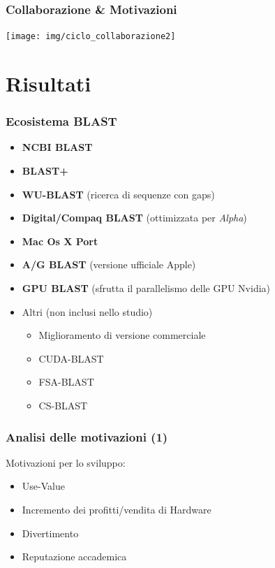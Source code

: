 \begin{frame}\frametitle{Collaborazione \& Motivazioni}

\begin{center}
    \texttt{[image: img/ciclo\_collaborazione2]}
\end{center}

\end{frame}

\section{Risultati}

\begin{frame}\frametitle{Ecosistema BLAST}

\Large

\begin{itemize}[<+->]
\itemsep1pt\parskip0pt
\item
  \alert{\textbf{NCBI BLAST}}
\item
  \alert{\textbf{BLAST+}}
\item
  \textbf{WU-BLAST} (ricerca di sequenze con gaps)
\item
  \textbf{Digital/Compaq BLAST} (ottimizzata per \emph{Alpha})
\item
  \textbf{Mac Os X Port}
\item
  \textbf{A/G BLAST} (versione ufficiale Apple)
\item
  \textbf{GPU BLAST} (sfrutta il parallelismo delle GPU Nvidia)
\item
  Altri (non inclusi nello studio)

  \begin{itemize}[<+->]
  \itemsep1pt\parskip0pt
  \item
    Miglioramento di versione commerciale
  \item
    CUDA-BLAST
  \item
    FSA-BLAST
  \item
    CS-BLAST
  \end{itemize}
\end{itemize}

\end{frame}

\begin{frame}\frametitle{Analisi delle motivazioni (1)}

\Large{Motivazioni per lo \alert{sviluppo}:}

\begin{itemize}[<+->]
\itemsep1pt\parskip0pt
\item
  Use-Value
\item
  Incremento dei profitti/vendita di Hardware
\item
  Divertimento
\item
  Reputazione accademica
\end{itemize}

\end{frame}

